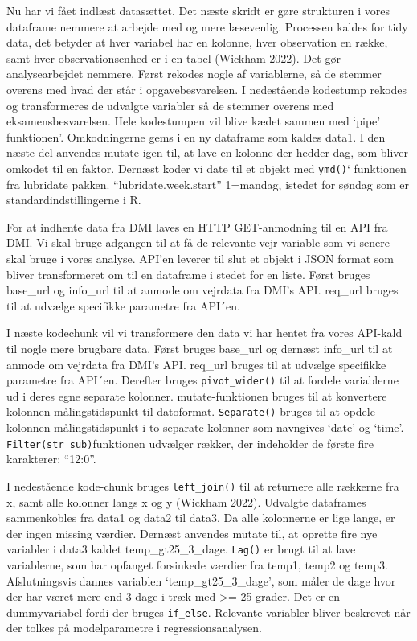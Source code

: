 \documentclass[
  12pt,
  a4paper,
  DIV=11,
  numbers=noendperiod,
  oneside,
  open=any]{scrartcl}
\begin{document}
Nu har vi fået indlæst datasættet. Det næste skridt er gøre strukturen i
vores dataframe nemmere at arbejde med og mere læsevenlig. Processen
kaldes for tidy data, det betyder at hver variabel har en kolonne, hver
observation en række, samt hver observationsenhed er i en tabel (Wickham
2022). Det gør analysearbejdet nemmere. Først rekodes nogle af
variablerne, så de stemmer overens med hvad der står i
opgavebesvarelsen. I nedestående kodestump rekodes og transformeres de
udvalgte variabler så de stemmer overens med eksamensbesvarelsen. Hele
kodestumpen vil blive kædet sammen med `pipe' funktionen'. Omkodningerne
gems i en ny dataframe som kaldes data1. I den næste del anvendes mutate
igen til, at lave en kolonne der hedder dag, som bliver omkodet til en
faktor. Dernæst koder vi date til et objekt med \texttt{ymd()}`
funktionen fra lubridate pakken. ``lubridate.week.start'' 1=mandag,
istedet for søndag som er standardindstillingerne i R.

For at indhente data fra DMI laves en HTTP GET-anmodning til en API fra
DMI. Vi skal bruge adgangen til at få de relevante vejr-variable som vi
senere skal bruge i vores analyse. API'en leverer til slut et objekt i
JSON format som bliver transformeret om til en dataframe i stedet for en
liste. Først bruges base\_url og info\_url til at anmode om vejrdata fra
DMI's API. req\_url bruges til at udvælge specifikke parametre fra
API´en.

I næste kodechunk vil vi transformere den data vi har hentet fra vores
API-kald til nogle mere brugbare data. Først bruges base\_url og dernæst
info\_url til at anmode om vejrdata fra DMI's API. req\_url bruges til
at udvælge specifikke parametre fra API´en. Derefter bruges
\texttt{pivot\_wider()} til at fordele variablerne ud i deres egne
separate kolonner. mutate-funktionen bruges til at konvertere kolonnen
målingstidspunkt til datoformat. \texttt{Separate()} bruges til at
opdele kolonnen målingstidspunkt i to separate kolonner som navngives
`date' og `time'. \texttt{Filter(str\_sub)}funktionen udvælger rækker,
der indeholder de første fire karakterer: ``12:0''.

I nedestående kode-chunk bruges \texttt{left\_join()} til at returnere
alle rækkerne fra x, samt alle kolonner langs x og y (Wickham 2022).
Udvalgte dataframes sammenkobles fra data1 og data2 til data3. Da alle
kolonnerne er lige lange, er der ingen missing værdier. Dernæst anvendes
mutate til, at oprette fire nye variabler i data3 kaldet
temp\_gt25\_3\_dage. \texttt{Lag()} er brugt til at lave variablerne,
som har opfanget forsinkede værdier fra temp1, temp2 og temp3.
Afslutningsvis dannes variablen `temp\_gt25\_3\_dage', som måler de dage
hvor der har været mere end 3 dage i træk med \textgreater= 25 grader.
Det er en dummyvariabel fordi der bruges \texttt{if\_else}. Relevante
variabler bliver beskrevet når der tolkes på modelparametre i
regressionsanalysen.
\end{document}
